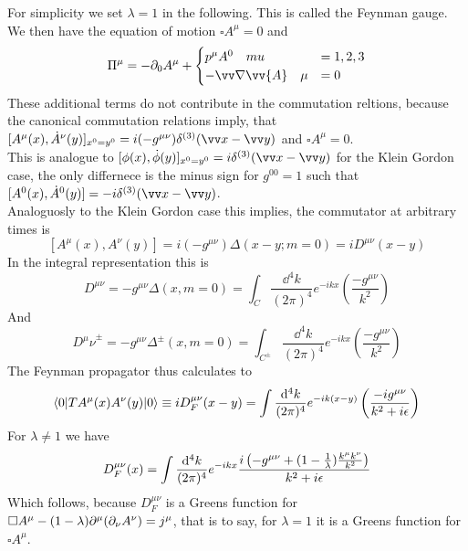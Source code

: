 For simplicity we set $\lambda = 1$ in the following. This is called the Feynman gauge.
We then have the equation of motion $\square A^\mu = 0$ and
\[ \Pi^\mu = - \p_0 A^\mu + \begin{cases} p^\mu A^0 ~~~mu &= 1,2,3\\
-\vn \vv{A} ~~~\mu &= 0\end{cases}\]
These additional terms do not contribute in the commutation reltions, because the canonical commutation relations imply, that $[A^\mu(x), \dot A^\nu(y)]_{x^0 = y^0} = i ( - g^{\mu\nu}) \delta^{(3)}(\vx - \vy)$ and $\square A^\mu = 0$.\\
This is analogue to $[\phi(x), \dot \phi(y)]_{x^0 = y^0} = i \delta^{(3)}(\vx - \vy)$  for the Klein Gordon case, the only differnece is the minus sign for $g^{00} = 1$ such that $[A^0(x), \dot A^0(y)] = - i \delta^{(3)}(\vx - \vy)$.\\
Analoguosly to the Klein Gordon case this implies, the commutator at arbitrary times is
\[ [A^\mu (x) , A^\nu(y)] = i (-g^{\mu\nu})\Delta(x-y; m = 0) = i D^{\mu\nu}(x-y)\]
In the integral representation this is
\[ D^{\mu\nu} = - g^{\mu\nu} \Delta(x, m = 0) = \int _C \frac{ \dd ^ 4k}{(2\pi)^4} e^{-ikx} \left( \frac{-g^{\mu\nu}}{k^2}\right)\]
And
\[ \left.D^\mu\nu\right.^\pm = - g^{\mu\nu} \Delta^\pm (x, m =0) = \int_{C^\pm} \frac{\dd ^4k}{(2\pi)^4} e^{-ikx} \left( \frac{-g^{\mu\nu}}{k^2}\right)\]
The Feynman propagator thus calculates to
\[ \langle 0 | T A^\mu(x) A^\nu(y) | 0 \rangle \equiv i D_F^{\mu\nu}(x-y) = \int \frac{{\rm d} ^4 k}{(2\pi)^4} e^{-ik(x-y)} \left( \frac{ -ig^{\mu\nu}}{k^2 + i \epsilon}\right)\]
For $\lambda \neq 1 $ we have 
\[ D^{\mu\nu}_F(x) = \int \frac{{\rm d} ^4 k}{(2\pi)^4} e^{-ikx} \frac{ i \left( - g^{\mu\nu} + ( 1 - \frac{1}{\lambda}) \frac{k^\mu k^\nu}{k^2}\right)}{k^2 + i \epsilon}\]
Which follows, because $D^{\mu\nu}_F$ is a Greens function for $\square A^\mu - ( 1-\lambda)\partial^\mu ( \partial_\nu A^\nu) = j^\mu$, that is to say, for $\lambda = 1$ it is a Greens function for $\square A^\mu$.

